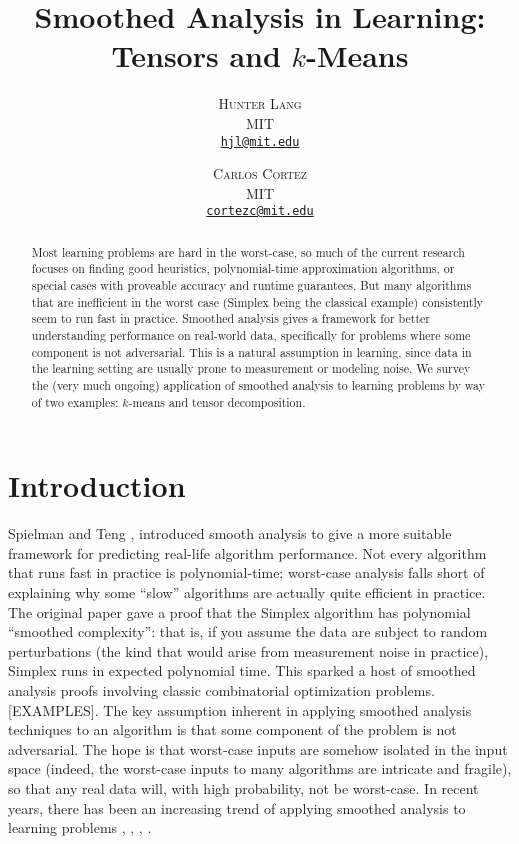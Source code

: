 \documentclass[11pt]{article}
\title{\vspace{-5mm}\fontsize{22pt}{10pt}\selectfont Smoothed Analysis in Learning: Tensors and $k$-Means}
\author{
\large
\textsc{Hunter Lang} \\
\normalsize MIT \\
\normalsize \href{mailto:hjl@mit.edu}{\texttt{hjl@mit.edu}}\\
\and
\textsc{Carlos Cortez} \\
\normalsize MIT \\
\normalsize \href{mailto:cortezc@mit.edu}{\texttt{cortezc@mit.edu}}\\
\vspace{-5mm}
}
\date{}
\theoremstyle{definition}
\begin{document}
\maketitle


\begin{abstract}
\noindent Most learning problems are hard in the worst-case, so much
of the current research focuses on finding good heuristics,
polynomial-time approximation algorithms, or special cases with
proveable accuracy and runtime guarantees. But many algorithms that
are inefficient in the worst case (Simplex being the classical
example) consistently seem to run fast in practice. Smoothed analysis
gives a framework for better understanding performance on real-world
data, specifically for problems where some component is not
adversarial. This is a natural assumption in learning, since data in
the learning setting are usually prone to measurement or modeling
noise. We survey the (very much ongoing) application of smoothed
analysis to learning problems by way of two examples: $k$-means and
tensor decomposition.
\end{abstract}

\section{Introduction}
Spielman and Teng \cite{SA}, \cite{SAtwo} introduced smooth analysis
to give a more suitable framework for predicting real-life algorithm
performance. Not every algorithm that runs fast in practice is
polynomial-time; worst-case analysis falls short of explaining why
some ``slow'' algorithms are actually quite efficient in practice. The
original paper \cite{SA} gave a proof that the Simplex algorithm has
polynomial ``smoothed complexity'': that is, if you assume the data
are subject to random perturbations (the kind that would arise from
measurement noise in practice), Simplex runs in expected polynomial
time. This sparked a host of smoothed analysis proofs involving
classic combinatorial optimization problems. [EXAMPLES]. The key
assumption inherent in applying smoothed analysis techniques to an
algorithm is that some component of the problem is not
adversarial. The hope is that worst-case inputs are somehow isolated
in the input space (indeed, the worst-case inputs to many algorithms
are intricate and fragile), so that any real data will, with high
probability, not be worst-case. In recent years, there has been an increasing trend of applying smoothed analysis to learning problems \cite{SAtwo}, \cite{SAkmeans}, \cite{PAC}, \cite{TD}.
\end{document}
